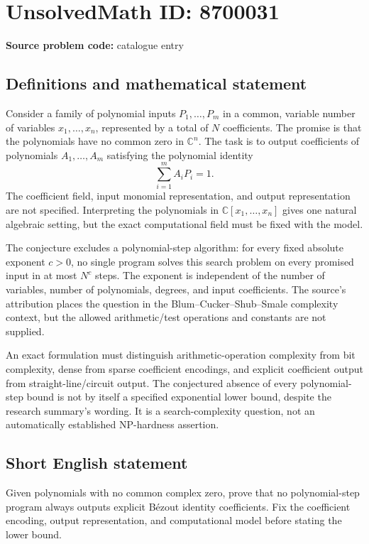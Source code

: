 \documentclass[11pt]{article}
\begin{document}
\section*{UnsolvedMath ID: 8700031}
\textbf{Source problem code:} catalogue entry
\subsection{Definitions and mathematical statement}
Consider a family of polynomial inputs $P_1,\ldots,P_m$ in a common, variable number of variables $x_1,\ldots,x_n$, represented by a total of $N$ coefficients. The promise is that the polynomials have no common zero in $\mathbb C^n$. The task is to output coefficients of polynomials $A_1,\ldots,A_m$ satisfying the polynomial identity
\[
\sum_{i=1}^m A_iP_i=1.
\]
The coefficient field, input monomial representation, and output representation are not specified. Interpreting the polynomials in $\mathbb C[x_1,\ldots,x_n]$ gives one natural algebraic setting, but the exact computational field must be fixed with the model.

The conjecture excludes a polynomial-step algorithm: for every fixed absolute exponent $c>0$, no single program solves this search problem on every promised input in at most $N^c$ steps. The exponent is independent of the number of variables, number of polynomials, degrees, and input coefficients. The source's attribution places the question in the Blum--Cucker--Shub--Smale complexity context, but the allowed arithmetic/test operations and constants are not supplied.

An exact formulation must distinguish arithmetic-operation complexity from bit complexity, dense from sparse coefficient encodings, and explicit coefficient output from straight-line/circuit output. The conjectured absence of every polynomial-step bound is not by itself a specified exponential lower bound, despite the research summary's wording. It is a search-complexity question, not an automatically established NP-hardness assertion.
\subsection{Short English statement}
Given polynomials with no common complex zero, prove that no polynomial-step program always outputs explicit B\'ezout identity coefficients. Fix the coefficient encoding, output representation, and computational model before stating the lower bound.
\end{document}
